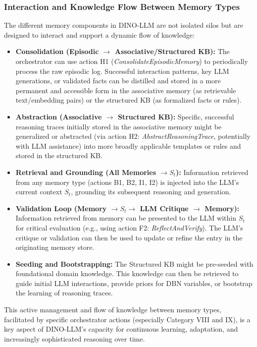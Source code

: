 \documentclass[11pt]{article}
\begin{document}
\subsubsection{Interaction and Knowledge Flow Between Memory Types}
\label{sssec:memory_interaction}
The different memory components in DINO-LLM are not isolated silos but are designed to interact and support a dynamic flow of knowledge:
\begin{itemize}
    \item \textbf{Consolidation (Episodic $\rightarrow$ Associative/Structured KB):} The orchestrator can use action H1 (\emph{ConsolidateEpisodicMemory}) to periodically process the raw episodic log. Successful interaction patterns, key LLM generations, or validated facts can be distilled and stored in a more permanent and accessible form in the associative memory (as retrievable text/embedding pairs) or the structured KB (as formalized facts or rules).
    \item \textbf{Abstraction (Associative $\rightarrow$ Structured KB):} Specific, successful reasoning traces initially stored in the associative memory might be generalized or abstracted (via action H2: \emph{AbstractReasoningTrace}, potentially with LLM assistance) into more broadly applicable templates or rules and stored in the structured KB.
    \item \textbf{Retrieval and Grounding (All Memories $\rightarrow S_t$):} Information retrieved from any memory type (actions B1, B2, I1, I2) is injected into the LLM's current context $S_t$, grounding its subsequent reasoning and generation.
    \item \textbf{Validation Loop (Memory $\rightarrow S_t \rightarrow$ LLM Critique $\rightarrow$ Memory):} Information retrieved from memory can be presented to the LLM within $S_t$ for critical evaluation (e.g., using action F2: \emph{ReflectAndVerify}). The LLM's critique or validation can then be used to update or refine the entry in the originating memory store.
    \item \textbf{Seeding and Bootstrapping:} The Structured KB might be pre-seeded with foundational domain knowledge. This knowledge can then be retrieved to guide initial LLM interactions, provide priors for DBN variables, or bootstrap the learning of reasoning traces.
\end{itemize}
This active management and flow of knowledge between memory types, facilitated by specific orchestrator actions (especially Category VIII and IX), is a key aspect of DINO-LLM's capacity for continuous learning, adaptation, and increasingly sophisticated reasoning over time.
\end{document}

